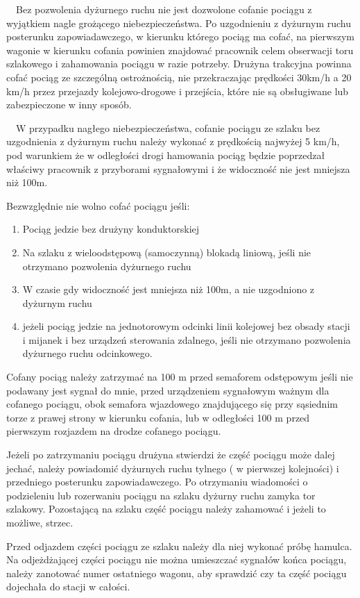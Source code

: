 \ \ Bez pozwolenia dyżurnego ruchu nie jest dozwolone cofanie pociągu z wyjątkiem nagle grożącego niebezpieczeństwa. Po
uzgodnieniu z dyżurnym ruchu posterunku zapowiadawczego, w kierunku którego pociąg ma cofać, na pierwszym wagonie w
kierunku cofania powinien znajdować pracownik celem obserwacji toru szlakowego i zahamowania pociągu w razie potrzeby.
Drużyna trakcyjna powinna cofać pociąg ze szczególną ostrożnością, nie przekraczając prędkości 30km/h a 20 km/h przez
przejazdy kolejowo-drogowe i przejścia, które nie są obsługiwane lub zabezpieczone w inny sposób.

\ \ W przypadku nagłego niebezpieczeństwa, cofanie pociągu ze szlaku bez uzgodnienia z dyżurnym ruchu należy wykonać z
prędkością najwyżej 5 km/h, pod warunkiem że w odległości drogi hamowania pociąg będzie poprzedzał właściwy pracownik z
przyborami sygnałowymi i że widoczność nie jest mniejsza niż 100m.

Bezwzględnie nie wolno cofać pociągu jeśli:

\begin{enumerate}
\item Pociąg jedzie bez drużyny konduktorskiej
\item Na szlaku z wieloodstępową (samoczynną) blokadą liniową, jeśli nie otrzymano pozwolenia dyżurnego ruchu
\item W czasie gdy widoczność jest mniejsza niż 100m, a nie uzgodniono z dyżurnym ruchu
\item jeżeli pociąg jedzie na jednotorowym odcinki linii kolejowej bez obsady stacji i mijanek i bez urządzeń sterowania
zdalnego, jeśli nie otrzymano pozwolenia dyżurnego ruchu odcinkowego.
\end{enumerate}
Cofany pociąg należy zatrzymać na 100 m przed semaforem odstępowym jeśli nie podawany jest sygnał do mnie, przed
urządzeniem sygnałowym ważnym dla cofanego pociągu, obok semafora wjazdowego znajdującego się przy sąsiednim torze z
prawej strony w kierunku cofania, lub w odległości 100 m przed pierwszym rozjazdem na drodze cofanego pociągu.

Jeżeli po zatrzymaniu pociągu drużyna stwierdzi że część pociągu może dalej jechać, należy powiadomić dyżurnych ruchu tylnego ( w pierwszej kolejności) i przedniego posterunku zapowiadawczego. Po otrzymaniu wiadomości o podzieleniu lub rozerwaniu pociągu na szlaku dyżurny ruchu zamyka tor szlakowy. Pozostającą na szlaku część pociągu należy zahamować i jeżeli to możliwe, strzec.

Przed odjazdem części pociągu ze szlaku należy dla niej wykonać próbę hamulca. Na odjeżdżającej części pociągu nie można umieszczać sygnałów końca pociągu, należy zanotować numer ostatniego wagonu, aby sprawdzić czy ta część pociągu dojechała do stacji w całości.

